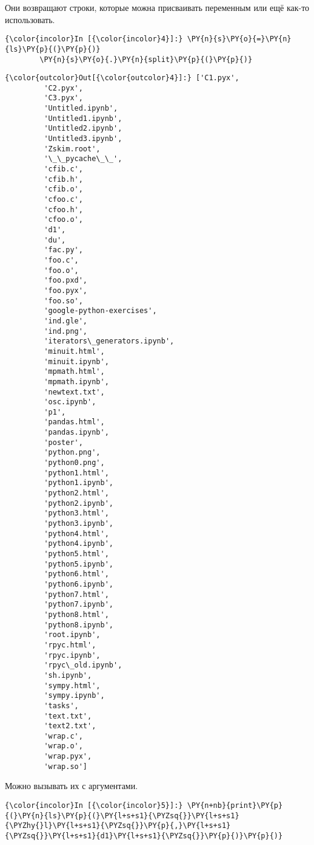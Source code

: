     Они возвращают строки, которые можна присваивать переменным или ещё
как-то использовать.

    \begin{Verbatim}[commandchars=\\\{\}]
{\color{incolor}In [{\color{incolor}4}]:} \PY{n}{s}\PY{o}{=}\PY{n}{ls}\PY{p}{(}\PY{p}{)}
        \PY{n}{s}\PY{o}{.}\PY{n}{split}\PY{p}{(}\PY{p}{)}
\end{Verbatim}


\begin{Verbatim}[commandchars=\\\{\}]
{\color{outcolor}Out[{\color{outcolor}4}]:} ['C1.pyx',
         'C2.pyx',
         'C3.pyx',
         'Untitled.ipynb',
         'Untitled1.ipynb',
         'Untitled2.ipynb',
         'Untitled3.ipynb',
         'Zskim.root',
         '\_\_pycache\_\_',
         'cfib.c',
         'cfib.h',
         'cfib.o',
         'cfoo.c',
         'cfoo.h',
         'cfoo.o',
         'd1',
         'du',
         'fac.py',
         'foo.c',
         'foo.o',
         'foo.pxd',
         'foo.pyx',
         'foo.so',
         'google-python-exercises',
         'ind.gle',
         'ind.png',
         'iterators\_generators.ipynb',
         'minuit.html',
         'minuit.ipynb',
         'mpmath.html',
         'mpmath.ipynb',
         'newtext.txt',
         'osc.ipynb',
         'p1',
         'pandas.html',
         'pandas.ipynb',
         'poster',
         'python.png',
         'python0.png',
         'python1.html',
         'python1.ipynb',
         'python2.html',
         'python2.ipynb',
         'python3.html',
         'python3.ipynb',
         'python4.html',
         'python4.ipynb',
         'python5.html',
         'python5.ipynb',
         'python6.html',
         'python6.ipynb',
         'python7.html',
         'python7.ipynb',
         'python8.html',
         'python8.ipynb',
         'root.ipynb',
         'rpyc.html',
         'rpyc.ipynb',
         'rpyc\_old.ipynb',
         'sh.ipynb',
         'sympy.html',
         'sympy.ipynb',
         'tasks',
         'text.txt',
         'text2.txt',
         'wrap.c',
         'wrap.o',
         'wrap.pyx',
         'wrap.so']
\end{Verbatim}
            
    Можно вызывать их с аргументами.

    \begin{Verbatim}[commandchars=\\\{\}]
{\color{incolor}In [{\color{incolor}5}]:} \PY{n+nb}{print}\PY{p}{(}\PY{n}{ls}\PY{p}{(}\PY{l+s+s1}{\PYZsq{}}\PY{l+s+s1}{\PYZhy{}l}\PY{l+s+s1}{\PYZsq{}}\PY{p}{,}\PY{l+s+s1}{\PYZsq{}}\PY{l+s+s1}{d1}\PY{l+s+s1}{\PYZsq{}}\PY{p}{)}\PY{p}{)}
\end{Verbatim}


